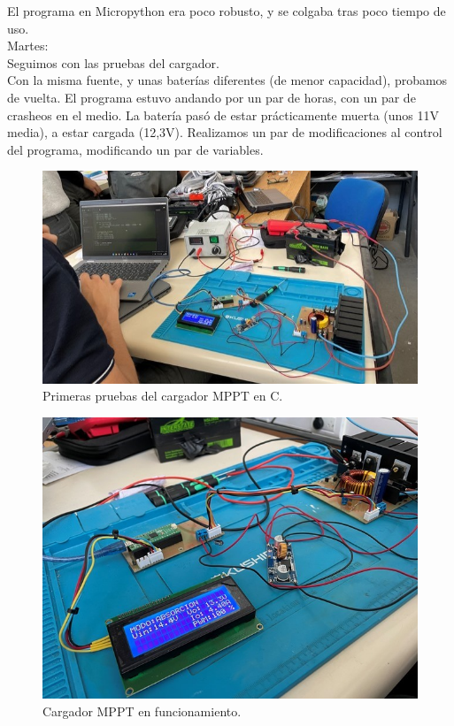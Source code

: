 El programa en Micropython era poco robusto, y se colgaba tras poco tiempo de uso.\\

Martes:\\

Seguimos con las pruebas del cargador.\\
Con la misma fuente, y unas baterías diferentes (de menor capacidad), probamos de vuelta.
El programa estuvo andando por un par de horas, con un par de crasheos en el medio. La batería pasó de estar prácticamente muerta (unos 11V media), a estar cargada (12,3V). 
Realizamos un par de modificaciones al control del programa, modificando un par de variables.\\

\begin{figure}[H]
    \centering
    \includegraphics[width=0.75\linewidth]{informes/IMG_8883.jpg}
    \caption{Primeras pruebas del cargador MPPT en C.}
\end{figure}

\begin{figure}[H]
    \centering
    \includegraphics[width=0.75\linewidth]{informes/IMG_8884.jpg}
    \caption{Cargador MPPT en funcionamiento.}
\end{figure}

